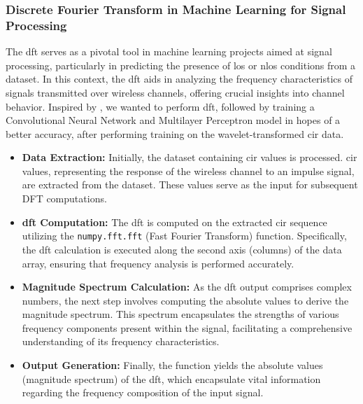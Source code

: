 \subsubsection{\Gls{Discrete Fourier Transform} in Machine Learning for Signal Processing}

The \acrshort{dft} serves as a pivotal tool in machine learning projects aimed at signal processing, particularly in predicting the presence of \acrshort{los} or \acrshort{nlos} conditions from a dataset. In this context, the \acrshort{dft} aids in analyzing the frequency characteristics of signals transmitted over wireless channels, offering crucial insights into channel behavior. Inspired by \cite{8682194}, we wanted to perform \acrshort{dft}, followed by training a \Gls{Convolutional Neural Network} and \Gls{Multilayer Perceptron} model in hopes of a better accuracy, after performing training on the wavelet-transformed \acrshort{cir} data.

\begin{itemize}
    \item \textbf{Data Extraction:} Initially, the dataset containing \acrshort{cir} values is processed. \acrshort{cir} values, representing the response of the wireless channel to an impulse signal, are extracted from the dataset. These values serve as the input for subsequent DFT computations.
    
    \item \textbf{\acrshort{dft} Computation:} The \acrshort{dft} is computed on the extracted \acrshort{cir} sequence utilizing the \texttt{numpy.fft.fft} (Fast Fourier Transform) function. Specifically, the \acrshort{dft} calculation is executed along the second axis (columns) of the data array, ensuring that frequency analysis is performed accurately.
    
    \item \textbf{Magnitude Spectrum Calculation:} As the \acrshort{dft} output comprises complex numbers, the next step involves computing the absolute values to derive the magnitude spectrum. This spectrum encapsulates the strengths of various frequency components present within the signal, facilitating a comprehensive understanding of its frequency characteristics.
    
    \item \textbf{Output Generation:} Finally, the function yields the absolute values (magnitude spectrum) of the \acrshort{dft}, which encapsulate vital information regarding the frequency composition of the input signal.
\end{itemize}

